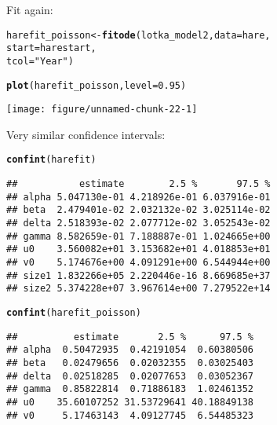 \documentclass{article}\usepackage[]{graphicx}\usepackage[]{color}
\makeatletter
\def\maxwidth{ %
  \ifdim\Gin@nat@width>\linewidth
    \linewidth
  \else
    \Gin@nat@width
  \fi
}
\newcommand{\hlnum}[1]{\textcolor[rgb]{0.686,0.059,0.569}{#1}}%
\newcommand{\hlstr}[1]{\textcolor[rgb]{0.192,0.494,0.8}{#1}}%
\newcommand{\hlstd}[1]{\textcolor[rgb]{0.345,0.345,0.345}{#1}}%
\newcommand{\hlkwb}[1]{\textcolor[rgb]{0.69,0.353,0.396}{#1}}%
\newcommand{\hlkwc}[1]{\textcolor[rgb]{0.333,0.667,0.333}{#1}}%
\newcommand{\hlkwd}[1]{\textcolor[rgb]{0.737,0.353,0.396}{\textbf{#1}}}%
\newenvironment{kframe}{%
 \def\at@end@of@kframe{}%
 \ifinner\ifhmode%
  \def\at@end@of@kframe{\end{minipage}}%
  \begin{minipage}{\columnwidth}%
 \fi\fi%
 \def\FrameCommand##1{\hskip\@totalleftmargin \hskip-\fboxsep
 \colorbox{shadecolor}{##1}\hskip-\fboxsep
     \hskip-\linewidth \hskip-\@totalleftmargin \hskip\columnwidth}%
 \MakeFramed {\advance\hsize-\width
   \@totalleftmargin\z@ \linewidth\hsize
   \@setminipage}}%
 {\par\unskip\endMakeFramed%
 \at@end@of@kframe}
\newenvironment{knitrout}{}{} %
\makeatother
\begin{document}
Fit again:
\begin{knitrout}
\color{fgcolor}\begin{kframe}
\begin{alltt}
\hlstd{harefit_poisson} \hlkwb{<-} \hlkwd{fitode}\hlstd{(lotka_model2,} \hlkwc{data}\hlstd{=hare,}
                  \hlkwc{start}\hlstd{=harestart,}
                  \hlkwc{tcol}\hlstd{=}\hlstr{"Year"}\hlstd{)}
\end{alltt}


{\ttfamily\noindent\itshape\color{messagecolor}{\#\# Fitting ode ...}}

{\ttfamily\noindent\itshape\color{messagecolor}{\#\# Computing vcov on the original scale ...}}\begin{alltt}
\hlkwd{plot}\hlstd{(harefit_poisson,} \hlkwc{level}\hlstd{=}\hlnum{0.95}\hlstd{)}
\end{alltt}
\end{kframe}
\texttt{[image: figure/unnamed-chunk-22-1]} 

\end{knitrout}

Very similar confidence intervals:
\begin{knitrout}
\color{fgcolor}\begin{kframe}
\begin{alltt}
\hlkwd{confint}\hlstd{(harefit)}
\end{alltt}
\begin{verbatim}
##           estimate        2.5 %       97.5 %
## alpha 5.047130e-01 4.218926e-01 6.037916e-01
## beta  2.479401e-02 2.032132e-02 3.025114e-02
## delta 2.518393e-02 2.077712e-02 3.052543e-02
## gamma 8.582659e-01 7.188887e-01 1.024665e+00
## u0    3.560082e+01 3.153682e+01 4.018853e+01
## v0    5.174676e+00 4.091291e+00 6.544944e+00
## size1 1.832266e+05 2.220446e-16 8.669685e+37
## size2 5.374228e+07 3.967614e+00 7.279522e+14
\end{verbatim}
\begin{alltt}
\hlkwd{confint}\hlstd{(harefit_poisson)}
\end{alltt}
\begin{verbatim}
##          estimate       2.5 %      97.5 %
## alpha  0.50472935  0.42191054  0.60380506
## beta   0.02479656  0.02032355  0.03025403
## delta  0.02518285  0.02077653  0.03052367
## gamma  0.85822814  0.71886183  1.02461352
## u0    35.60107252 31.53729641 40.18849138
## v0     5.17463143  4.09127745  6.54485323
\end{verbatim}
\end{kframe}
\end{knitrout}


\end{document}

